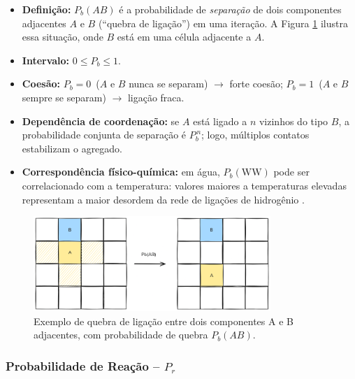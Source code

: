 \documentclass[12pt,oneside]{report}
\begin{document}
\begin{itemize}
    \item \textbf{Definição:} $P_b(AB)$ é a probabilidade de
          \emph{separação} de dois componentes adjacentes $A$ e $B$
          (``quebra de ligação'') em uma iteração. A Figura \ref{fig:quebra_ligacao} ilustra essa situação, onde $B$ está em uma célula adjacente a $A$.
    \item \textbf{Intervalo:} $0 \le P_b \le 1$.
    \item \textbf{Coesão:} $P_b=0$ \,($A$ e $B$ nunca se separam)
          $\rightarrow$ forte coesão;
          $P_b=1$ \,($A$ e $B$ sempre se separam) $\rightarrow$ ligação fraca.
    \item \textbf{Dependência de coordenação:} se $A$ está ligado a
          $n$ vizinhos do tipo $B$, a probabilidade conjunta de separação é
          $P_b^{\,n}$; logo, múltiplos contatos estabilizam o agregado.
    \item \textbf{Correspondência físico-química:}
          em água, $P_b(\mathrm{WW})$ pode ser correlacionado com a temperatura:
          valores maiores a temperaturas elevadas representam a maior
          desordem da rede de ligações de hidrogênio \cite{kier2005}.
\end{itemize}

\begin{figure}[H]
    \centering
    \includegraphics[width=0.8\textwidth]{PbAB.png}
    \caption{\small Exemplo de quebra de ligação entre dois componentes A e B adjacentes, com probabilidade de quebra $P_b(AB)$.}
    \label{fig:quebra_ligacao}
\end{figure}

\subsubsection{Probabilidade de Reação – \texorpdfstring{$P_r$}{Pr}}
\label{subsubsec:Pr}
\end{document}
